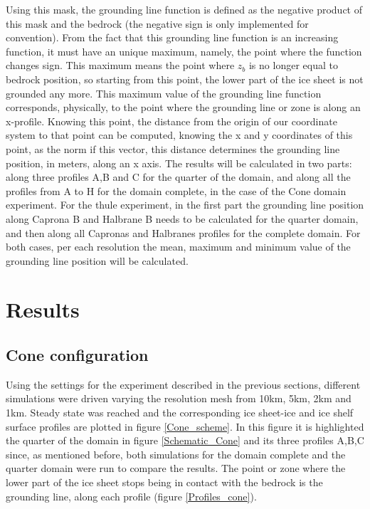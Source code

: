 \documentclass{article}
\begin{document}
Using this mask, the grounding line function is defined as the negative product of this mask and the bedrock (the negative sign is only implemented for convention). From the fact that this grounding line function is an increasing function, it must have an unique maximum, namely, the point where the function changes sign. This maximum means the point where $z_b$ is no longer equal to bedrock position, so starting from this point, the lower part of the ice sheet is not grounded any more. This maximum value of the grounding line function corresponds, physically, to the point where the grounding line or zone is along an x-profile. Knowing this point, the distance from the origin of our coordinate system to that point can be computed, knowing the x and y coordinates of this point, as the norm if this vector, this distance determines the grounding line position, in meters, along an x axis. The results will be calculated in two parts: along three profiles A,B and C for the quarter of the domain, and along all the profiles from A to H for the domain complete, in the case of the Cone domain experiment. For the thule experiment, in the first part the grounding line position along Caprona B and Halbrane B needs to be calculated for the quarter domain, and then along all Capronas and Halbranes profiles for the complete domain. For both cases, per each resolution the mean, maximum and minimum value of the grounding line position will be calculated.

\section{Results}
\label{Results}
\subsection{Cone configuration}

Using the settings for the experiment described in the previous sections, different simulations were driven varying the resolution mesh from 10km, 5km, 2km and 1km. Steady state was reached and the corresponding ice sheet-ice and ice shelf surface profiles are plotted in figure \ref{Cone_scheme}. In this figure it is highlighted the quarter of the domain in figure \ref{Schematic_Cone} and its three profiles A,B,C since, as mentioned before, both simulations for the domain complete and the quarter domain were run to compare the results. The point or zone where the lower part of the ice sheet stops being in contact with the bedrock is the grounding line, along each profile (figure \ref{Profiles_cone}).
\end{document}
